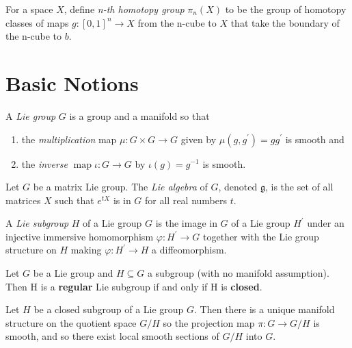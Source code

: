 \documentclass[11pt]{homework}
\begin{document}
\begin{definition}
    For a space $X$, define \textit{n-th homotopy group} $\pi_n(X)$ to be the group of homotopy classes of maps $g:[0,1]^{n}\to X$ from the n-cube to $X$ that take the boundary of the n-cube to $b$.
\end{definition}

\section*{Basic Notions}

\begin{definition}
    A \textit{Lie group} $G$ is a group and a manifold so that
    \begin{enumerate}
        \item the \textit{multiplication} map $\mu: G \times G \rightarrow G$ given by $\mu\left(g, g^{\prime}\right)=g g^{\prime}$ is smooth and
        \item the \textit{inverse} $\operatorname{map} \iota: G \rightarrow G$ by $\iota(g)=g^{-1}$ is smooth.
    \end{enumerate}
\end{definition}

\begin{definition}
    Let $G$ be a matrix Lie group. The \textit{Lie algebra} of $G$, denoted $\mathfrak{g}$, is the set of all matrices $X$ such that $e^{t X}$ is in $G$ for all real numbers $t$.
\end{definition}

\begin{definition}
    A \textit{Lie subgroup} $H$ of a Lie group $G$ is the image in $G$ of a Lie group $H^{\prime}$ under an injective immersive homomorphism $\varphi: H^{\prime} \rightarrow G$ together with the Lie group structure on $H$ making $\varphi: H^{\prime} \rightarrow H$ a diffeomorphism.
\end{definition}

\begin{theorem}
    Let $G$ be a Lie group and $H \subseteq G$ a subgroup (with no manifold assumption). Then $\mathrm{H}$ is a \textbf{regular} Lie subgroup if and only if $\mathrm{H}$ is \textbf{closed}.
\end{theorem}

\begin{theorem}
    Let $H$ be a closed subgroup of a Lie group $G .$ Then there is a unique manifold structure on the quotient space $G / H$ so the projection map $\pi: G \rightarrow G / H$ is smooth, and so there exist local smooth sections of $G / H$ into $G$.
\end{theorem}
\end{document}
